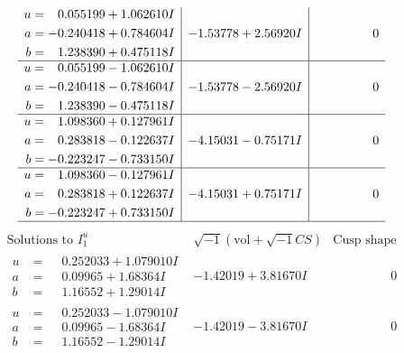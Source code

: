 \documentclass[1p]{elsarticle_modified}
\theoremstyle{definition}
\newcommand{\I}{\sqrt{-1}}
\begin{document}
$$\begin{array}{c|c|c}
\begin{aligned}
u &= \phantom{-}0.055199 + 1.062610 I \\
a &= -0.240418 + 0.784604 I \\
b &= \phantom{-}1.238390 + 0.475118 I\end{aligned}
 & -1.53778 + 2.56920 I & \phantom{-0.000000 } 0 \\ \hline\begin{aligned}
u &= \phantom{-}0.055199 - 1.062610 I \\
a &= -0.240418 - 0.784604 I \\
b &= \phantom{-}1.238390 - 0.475118 I\end{aligned}
 & -1.53778 - 2.56920 I & \phantom{-0.000000 } 0 \\ \hline\begin{aligned}
u &= \phantom{-}1.098360 + 0.127961 I \\
a &= \phantom{-}0.283818 - 0.122637 I \\
b &= -0.223247 - 0.733150 I\end{aligned}
 & -4.15031 - 0.75171 I & \phantom{-0.000000 } 0 \\ \hline\begin{aligned}
u &= \phantom{-}1.098360 - 0.127961 I \\
a &= \phantom{-}0.283818 + 0.122637 I \\
b &= -0.223247 + 0.733150 I\end{aligned}
 & -4.15031 + 0.75171 I & \phantom{-0.000000 } 0\\
 \hline 
 \end{array}$$\newpage$$\begin{array}{c|c|c}  
\text{Solutions to }I^u_{1}& \I (\text{vol} + \sqrt{-1}CS) & \text{Cusp shape}\\
 \hline 
\begin{aligned}
u &= \phantom{-}0.252033 + 1.079010 I \\
a &= \phantom{-}0.09965 + 1.68364 I \\
b &= \phantom{-}1.16552 + 1.29014 I\end{aligned}
 & -1.42019 + 3.81670 I & \phantom{-0.000000 } 0 \\ \hline\begin{aligned}
u &= \phantom{-}0.252033 - 1.079010 I \\
a &= \phantom{-}0.09965 - 1.68364 I \\
b &= \phantom{-}1.16552 - 1.29014 I\end{aligned}
 & -1.42019 - 3.81670 I & \phantom{-0.000000 } 0 \\ \hline\begin{aligned}

\end{aligned}
\end{array}$$
\end{document}
